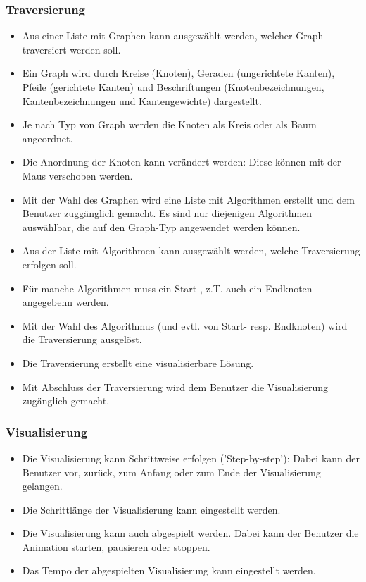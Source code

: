 \subsubsection{Traversierung}
\label{subsubsec:Traversierung}
\begin{itemize}
  \item Aus einer Liste mit Graphen kann ausgew\"ahlt werden, welcher Graph traversiert werden soll.
  \item Ein Graph wird durch Kreise (Knoten), Geraden (ungerichtete Kanten), Pfeile (gerichtete Kanten) und Beschriftungen (Knotenbezeichnungen, Kantenbezeichnungen und Kantengewichte) dargestellt.
  \item Je nach Typ von Graph werden die Knoten als Kreis oder als Baum angeordnet.
  \item Die Anordnung der Knoten kann ver\"andert werden: Diese k\"onnen mit der Maus verschoben werden.
  \item Mit der Wahl des Graphen wird eine Liste mit Algorithmen erstellt und dem Benutzer zugg\"anglich gemacht. Es sind nur diejenigen Algorithmen ausw\"ahlbar, die auf den Graph-Typ angewendet werden k\"onnen.
  \item Aus der Liste mit Algorithmen kann ausgew\"ahlt werden, welche Traversierung erfolgen soll.
  \item F\"ur manche Algorithmen muss ein Start-, z.T. auch ein Endknoten angegebenn werden.
  \item Mit der Wahl des Algorithmus (und evtl. von Start- resp. Endknoten) wird die Traversierung ausgel\"ost.
  \item Die Traversierung erstellt eine visualisierbare L\"osung.
  \item Mit Abschluss der Traversierung wird dem Benutzer die Visualisierung zug\"anglich gemacht.
\end{itemize}
% 
\subsubsection{Visualisierung}
\label{subsubsec:Visualisierung}
\begin{itemize}
  \item Die Visualisierung kann Schrittweise erfolgen ('Step-by-step'): Dabei kann der Benutzer vor, zur\"uck, zum Anfang oder zum Ende der Visualisierung gelangen.
  \item Die Schrittl\"ange der Visualisierung kann eingestellt werden.
  \item Die Visualisierung kann auch abgespielt werden. Dabei kann der Benutzer die Animation starten, pausieren oder stoppen.
  \item Das Tempo der abgespielten Visualisierung kann eingestellt werden.
\end{itemize}
% 
